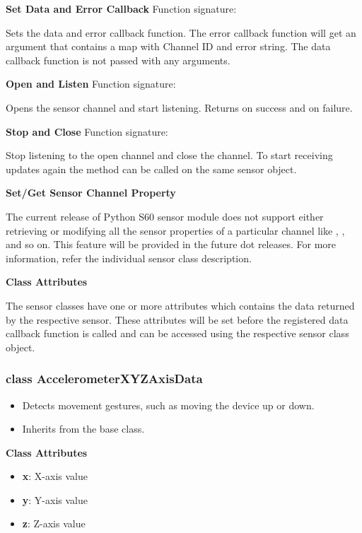 {\bf Set Data and Error Callback} \break
Function signature: 

Sets the data and error callback function. The error callback function will get an argument that contains a map with Channel ID and error string. The data callback function is not passed with any arguments.

{\bf Open and Listen} \break
Function signature: 

Opens the sensor channel and start listening. Returns  on success and  on failure.

{\bf Stop and Close} \break
Function signature: 

Stop listening to the open channel and close the channel. To start receiving updates again the  method can be called on the same sensor object.

{\bf Set/Get Sensor Channel Property} \break

The current release of Python S60 sensor module does not support either retrieving or modifying all the sensor properties of a particular channel like , ,  and so on. This feature will be provided in the future dot releases. For more information, refer the individual sensor class description.

{\bf Class Attributes} \break

The sensor classes have one or more attributes which contains the data returned by the respective sensor. These attributes will be set before the registered data callback function is called and can be accessed using the respective sensor class object.

\subsubsection{class AccelerometerXYZAxisData}

\begin{itemize}
\item Detects movement gestures, such as moving the device up or down.
\item Inherits from the  base class.
\end{itemize}

{\bf Class Attributes} \break

\begin{itemize}
\item {\bf x}: X-axis value
\item {\bf y}: Y-axis value
\item {\bf z}: Z-axis value
\end{itemize}

